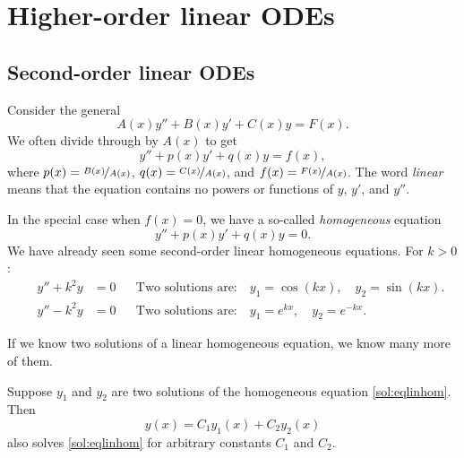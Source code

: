 \chapter{Higher-order linear ODEs} \label{ho:chapter}


\section{Second-order linear ODEs}
\label{solinear:section}


Consider the general
\emph{}
\begin{equation*}
A(x) y'' + B(x)y' + C(x)y = F(x) .
\end{equation*}
We often divide through by $A(x)$ to get
\begin{equation} \label{sol:eqlin}
y'' + p(x)y' + q(x)y = f(x) ,
\end{equation}
where $p(x) = \nicefrac{B(x)}{A(x)}$, $q(x) = \nicefrac{C(x)}{A(x)}$, and
$f(x) = \nicefrac{F(x)}{A(x)}$.
The word \emph{linear} means that the equation contains no powers or
functions of $y$, $y'$, and $y''$.

In the special case when $f(x) = 0$, we have a so-called
\emph{homogeneous}
equation
\begin{equation} \label{sol:eqlinhom}
y'' + p(x)y' + q(x)y = 0 .
\end{equation}
We have already seen some second-order linear homogeneous equations.
For $k > 0$:
\begin{align*}
\qquad y'' + k^2 y & = 0 &
& \text{Two solutions are:} \quad y_1 = \cos (kx), \quad y_2 = \sin(kx) . \qquad \\
\qquad y'' - k^2 y & = 0 &
& \text{Two solutions are:} \quad y_1 = e^{kx}, \quad y_2 = e^{-kx} . \qquad
\end{align*}

If we know two solutions of a linear homogeneous equation, we know many
more of them.

\begin{theorem}[Superposition]
Suppose $y_1$ and $y_2$ are two solutions of the
homogeneous equation \eqref{sol:eqlinhom}.  Then 
\begin{equation*}
y(x) = C_1 y_1(x) + C_2 y_2(x)
\end{equation*}
also solves \eqref{sol:eqlinhom} for arbitrary constants $C_1$ and $C_2$.
\end{theorem}

